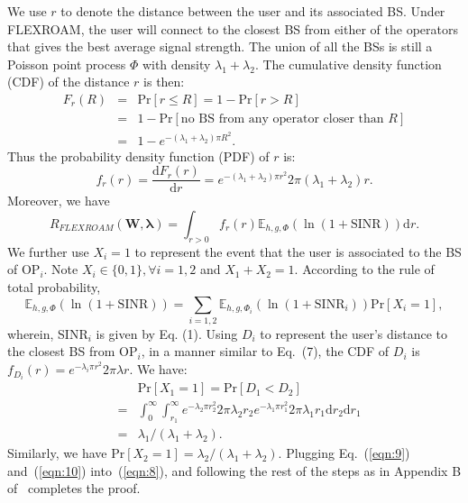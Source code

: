 \documentclass[conference]{IEEEtran}
\begin{document}
\begin{IEEEproof}
We use $r$ to denote the distance between the user and its associated BS. Under FLEXROAM, the user will connect to the closest BS from either of the operators that gives the best average signal strength. The union of all the BSs is still a Poisson point process $\Phi$ with density $\lambda_1 + \lambda_2$. The cumulative density function (CDF) of the distance $r$ is then:
\begin{eqnarray}
F_r(R) &=& \textrm{Pr}[r \leq R] = 1 - \textrm{Pr}[r > R] \nonumber \\
&=& 1 - \textrm{Pr}[\textrm{no BS from any operator closer than $R$}] \nonumber \\
&=& 1 - e^{-(\lambda_1 + \lambda_2) \pi R^2}.
\end{eqnarray}
Thus the probability density function (PDF) of $r$ is:
\begin{equation}
f_r(r) = \frac{\mbox{d}F_r(r)}{\mbox{d}r} = e^{-(\lambda_1 + \lambda_2) \pi r^2} 2 \pi (\lambda_1 + \lambda_2) r.
\end{equation}
Moreover, we have
\begin{equation} \label{eqn:8}
R_{FLEXROAM}(\mathbf{W}, \boldsymbol \lambda) = \int_{r>0} f_r(r) \mathbb{E}_{h, g, \Phi}(\ln(1 + \textrm{SINR})) \mbox{d}r.
\end{equation}
We further use $X_i = 1$ to represent the event that the user is associated to the BS of OP$_i$. Note $X_i \in \{0, 1\}, \forall i = 1, 2$ and $X_1 + X_2 = 1$. According to the rule of total probability,
\begin{equation} \label{eqn:9}
\mathbb{E}_{h,g,\Phi}(\ln(1 + \textrm{SINR})) = \sum_{i = 1, 2}\mathbb{E}_{h,g,\Phi_i}(\ln(1 + \textrm{SINR}_i)) \textrm{Pr}[X_i = 1],
\end{equation}
wherein, SINR$_i$ is given by Eq. (1). Using $D_i$ to represent the user's distance to the closest BS from OP$_i$, in a manner similar to Eq.~(7), the CDF of $D_i$ is $f_{D_i}(r) = e^{-\lambda_i \pi r^2} 2 \pi \lambda r$. We have:
\begin{eqnarray} \label{eqn:10}
&& \textrm{Pr}[X_1 = 1] = \textrm{Pr}[D_1 < D_2] \nonumber \\
&=& \int_{0}^{\infty} \int_{r_1}^{\infty} e^{-\lambda_2 \pi r_2^2} 2 \pi \lambda_2 r_2 e^{-\lambda_1 \pi r_1^2} 2 \pi \lambda_1 r_1 \mbox{d}r_2 \mbox{d}r_1 \nonumber \\
&=& \lambda_1 / (\lambda_1 + \lambda_2).
\end{eqnarray}
Similarly, we have $\textrm{Pr}[X_2 = 1] = \lambda_2 / (\lambda_1 + \lambda_2)$. Plugging Eq.~(\ref{eqn:9}) and~(\ref{eqn:10}) into~(\ref{eqn:8}), and following the rest of the steps as in Appendix B of~\cite{Jeffrey@TCOM10} completes the proof.
\end{IEEEproof}
\end{document}
